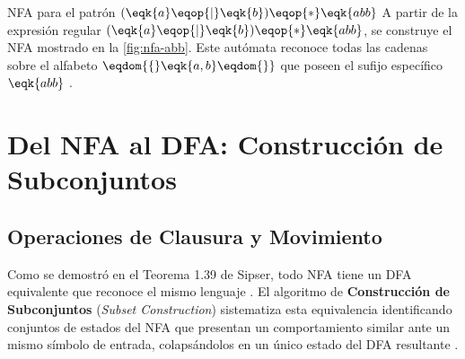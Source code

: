 \begin{ejemplo}{NFA para el patrón $(\eqk{a} \eqop{\mid} \eqk{b})\eqop{*} \eqk{abb}$}
A partir de la expresión regular $(\eqk{a} \eqop{\mid} \eqk{b})\eqop{*} \eqk{abb}$, se construye el NFA mostrado en la \cref{fig:nfa-abb}. Este autómata reconoce todas las cadenas sobre el alfabeto $\eqdom{\{} \eqk{a, b} \eqdom{\}}$ que poseen el sufijo específico $\eqk{abb}$ \cite{sipser2012introduction}.

\begin{center}
  \label{fig:nfa-abb}
\end{center}
\end{ejemplo}

\section{Del NFA al DFA: Construcción de Subconjuntos}
\label{sec:2_4_subconjuntos}

\subsection{Operaciones de Clausura y Movimiento}

Como se demostró en el Teorema 1.39 de Sipser, todo NFA tiene un DFA equivalente que reconoce el mismo lenguaje \cite{sipser2012introduction}. El algoritmo de \textbf{Construcción de Subconjuntos} (\textit{Subset Construction}) sistematiza esta equivalencia identificando conjuntos de estados del NFA que presentan un comportamiento similar ante un mismo símbolo de entrada, colapsándolos en un único estado del DFA resultante \cite{aho2006compilers}.

